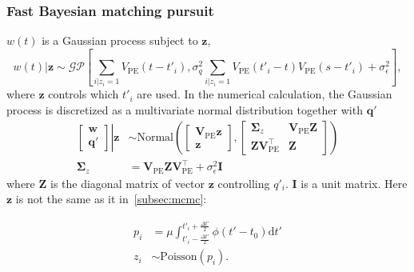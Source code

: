 \subsubsection{Fast Bayesian matching pursuit}
\label{subsec:fbmp}
$w(t)$ is a Gaussian process subject to $\bm{z}$,
\begin{equation}
    w(t)|\bm{z} \sim \mathcal{GP}\left[\sum_{i|z_i=1}V_\mathrm{PE}(t-t'_i), \sigma_q^2 \sum_{i|z_i=1}V_\mathrm{PE}(t'_i-t)V_\mathrm{PE}(s-t'_i) + \sigma_\epsilon^2 \right],
\end{equation}
where $\bm{z}$ controls which $t'_i$ are used.  In the numerical calculation, the Gaussian process is discretized as a multivariate normal distribution together with $\bm{q}'$
\begin{equation}
\label{eq:mgauss}
\begin{aligned}
    \left.
    \begin{bmatrix}
        \bm{w} \\
        \bm{q}'
    \end{bmatrix}
    \right\vert\bm{z}
    &\sim \mathrm{Normal}\left(
    \begin{bmatrix}
        \bm{V}_\mathrm{PE}\bm{z} \\
        \bm{z}
    \end{bmatrix}, 
    \begin{bmatrix}
        \bm{\Sigma}_z & \bm{V}_\mathrm{PE}\bm{Z} \\
        \bm{Z}\bm{V}_\mathrm{PE}^\intercal & \bm{Z}
    \end{bmatrix}
    \right) \\
    \bm{\Sigma}_z &= \bm{V}_\mathrm{PE}\bm{Z}\bm{V}_\mathrm{PE}^\intercal+\sigma_\epsilon^2\bm{I}
\end{aligned}
\end{equation}
where $\bm{Z}$ is the diagonal matrix of vector $\bm{z}$ controlling $q'_i$. $\bm{I}$ is a unit matrix. Here $\bm{z}$ is not the same as it in~\ref{subsec:mcmc}: 

\begin{equation}
  \begin{aligned}
    p_i &= \mu \int_{t'_i-\frac{\Delta t'}{2}}^{t'_i+\frac{\Delta t'}{2}} \phi(t' - t_0)\mathrm{d}t' \\
    z_i &\sim \mathrm{Poisson}(p_i).
  \end{aligned}
  \label{eq:poissonfbmp}
\end{equation}

